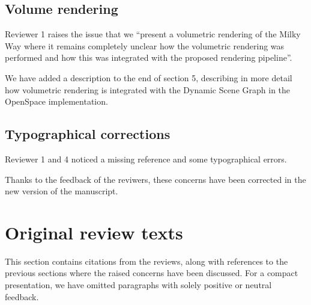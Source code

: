 \documentclass{article}
\begin{document}
\vspace*{1cm}

\begin{tcolorbox}
\subsection{Volume rendering}\label{concern:volumetric}
Reviewer 1 raises the issue that we ``present a volumetric rendering of the Milky Way where it remains completely unclear how the volumetric rendering was performed and how this was integrated with the proposed rendering pipeline''.
\end{tcolorbox}
We have added a description to the end of section 5, describing in more detail how volumetric rendering is integrated with the Dynamic Scene Graph in the OpenSpace implementation.

\vspace*{1cm}

\begin{tcolorbox}
\subsection{Typographical corrections}\label{concern:typos}
Reviewer 1 and 4 noticed a missing reference and some typographical errors.
\end{tcolorbox}
Thanks to the feedback of the reviwers, these concerns have been corrected in the new version of the manuscript.



%
%
%
\section{Original review texts}
This section contains citations from the reviews, along with references to the previous sections where the raised concerns have been discussed. For a compact presentation, we have omitted paragraphs with solely positive or neutral feedback.
%
%
\end{document}
